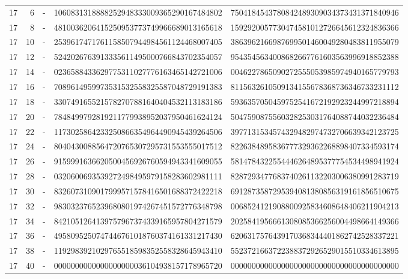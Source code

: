 \begin{longtable}{rrrll}
17 & 6 & - & 1060831318888252948333009365290167484802 & 7504184543780842489309034373431371840946 \\
17 & 8 & - & 4810036206415250953773749966689013165618 & 1592920057730474581012726645612324836366 \\
17 & 10 & - & 2539617471761158507944984561124468007405 & 3863962166987699501460049280483811955079 \\
17 & 12 & - & 5242026763913335611495000766843702354057 & 9543545634008682667761603563996918852388 \\
17 & 14 & - & 0236588433629775311027776163465142721006 & 0046227865090272555053985974940165779793 \\
17 & 16 & - & 7089614959973531532558325587048729191383 & 8115632610509134155678368736346733231112 \\
17 & 18 & - & 3307491655215782707881640404532113183186 & 5936357050459752541672192923244997218894 \\
17 & 20 & - & 7848499792819211779938952037950461624124 & 5047590875560328253031764088744032236484 \\
17 & 22 & - & 1173025864233250866354964490945439264506 & 3977131534574329482974732706639342123725 \\
17 & 24 & - & 8040430088564720765307295731553555017512 & 8226384895836777329362268898407334593174 \\
17 & 26 & - & 9159991636620500456926760594943341609055 & 5814784322554446264895377754534498941924 \\
17 & 28 & - & 0320600693539272498495979158283602981111 & 8287293477683740261132203006380991283719 \\
17 & 30 & - & 8326073109017999571578416501688372422218 & 6912873587295394081380856319161856510675 \\
17 & 32 & - & 9830323765239680801974267451572776348798 & 0068524121908800925834608648406211904213 \\
17 & 34 & - & 8421051264139757967374339165957804271579 & 2025841956661308085366256004498664149366 \\
17 & 36 & - & 4958095250747446761018760374161331217430 & 6206317576439170368344401862742528337221 \\
17 & 38 & - & 1192983921029765518598352558328645943410 & 5523721663722388372926529015510334613895 \\
17 & 40 & - & 0000000000000000000036104938157178965720 & 0000000000000000000000000000000000000000 \\
\end{longtable}
\endgroup

